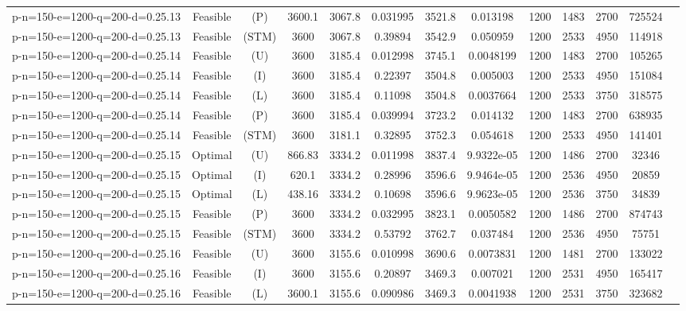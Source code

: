 \documentclass[landscape, a4paper]{article}
\newcommand{\STM}{\ensuremath{\mathrm{STM}}}
\newcommand{\Improved}{\ensuremath{\mathrm{I}}}
\newcommand{\Loose}{\ensuremath{\mathrm{L}}}
\newcommand{\Profit}{\ensuremath{\mathrm{P}}}
\newcommand{\Utility}{\ensuremath{\mathrm{U}}}
\begin{document}
\begin{center}
\begin{tabular}{lcccccccccccc}
p-n=150-e=1200-q=200-d=0.25.13 & Feasible & (\Profit) & 3600.1 & 3067.8 & 0.031995 & 3521.8 & 0.013198 & 1200 & 1483 & 2700 & 725524 & \\
p-n=150-e=1200-q=200-d=0.25.13 & Feasible & (\STM) & 3600 & 3067.8 & 0.39894 & 3542.9 & 0.050959 & 1200 & 2533 & 4950 & 114918 & \\
p-n=150-e=1200-q=200-d=0.25.14 & Feasible & (\Utility) & 3600 & 3185.4 & 0.012998 & 3745.1 & 0.0048199 & 1200 & 1483 & 2700 & 105265 & \\
p-n=150-e=1200-q=200-d=0.25.14 & Feasible & (\Improved) & 3600 & 3185.4 & 0.22397 & 3504.8 & 0.005003 & 1200 & 2533 & 4950 & 151084 & \\
p-n=150-e=1200-q=200-d=0.25.14 & Feasible & (\Loose) & 3600 & 3185.4 & 0.11098 & 3504.8 & 0.0037664 & 1200 & 2533 & 3750 & 318575 & \\
p-n=150-e=1200-q=200-d=0.25.14 & Feasible & (\Profit) & 3600 & 3185.4 & 0.039994 & 3723.2 & 0.014132 & 1200 & 1483 & 2700 & 638935 & \\
p-n=150-e=1200-q=200-d=0.25.14 & Feasible & (\STM) & 3600 & 3181.1 & 0.32895 & 3752.3 & 0.054618 & 1200 & 2533 & 4950 & 141401 & \\
p-n=150-e=1200-q=200-d=0.25.15 & Optimal & (\Utility) & 866.83 & 3334.2 & 0.011998 & 3837.4 & 9.9322e-05 & 1200 & 1486 & 2700 & 32346 & \\
p-n=150-e=1200-q=200-d=0.25.15 & Optimal & (\Improved) & 620.1 & 3334.2 & 0.28996 & 3596.6 & 9.9464e-05 & 1200 & 2536 & 4950 & 20859 & \\
p-n=150-e=1200-q=200-d=0.25.15 & Optimal & (\Loose) & 438.16 & 3334.2 & 0.10698 & 3596.6 & 9.9623e-05 & 1200 & 2536 & 3750 & 34839 & \\
p-n=150-e=1200-q=200-d=0.25.15 & Feasible & (\Profit) & 3600 & 3334.2 & 0.032995 & 3823.1 & 0.0050582 & 1200 & 1486 & 2700 & 874743 & \\
p-n=150-e=1200-q=200-d=0.25.15 & Feasible & (\STM) & 3600 & 3334.2 & 0.53792 & 3762.7 & 0.037484 & 1200 & 2536 & 4950 & 75751 & \\
p-n=150-e=1200-q=200-d=0.25.16 & Feasible & (\Utility) & 3600 & 3155.6 & 0.010998 & 3690.6 & 0.0073831 & 1200 & 1481 & 2700 & 133022 & \\
p-n=150-e=1200-q=200-d=0.25.16 & Feasible & (\Improved) & 3600 & 3155.6 & 0.20897 & 3469.3 & 0.007021 & 1200 & 2531 & 4950 & 165417 & \\
p-n=150-e=1200-q=200-d=0.25.16 & Feasible & (\Loose) & 3600.1 & 3155.6 & 0.090986 & 3469.3 & 0.0041938 & 1200 & 2531 & 3750 & 323682 & \\

\end{tabular}
\end{center}
\end{document}
